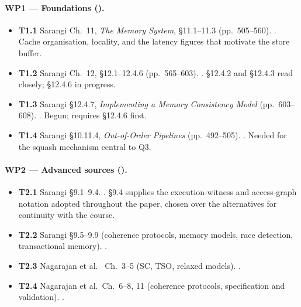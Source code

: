 \paragraph{WP1 --- Foundations ().}
\begin{itemize}[leftmargin=*,itemsep=1pt]
\item \textbf{T1.1} Sarangi \cite{sarangi2025basic} Ch.~11, \emph{The Memory
  System}, \S11.1--11.3 (pp.~505--560). . Cache organisation, locality,
  and the latency figures that motivate the store buffer.
\item \textbf{T1.2} Sarangi Ch.~12, \S12.1--12.4.6 (pp.~565--603). .
  \S12.4.2 and \S12.4.3 read closely; \S12.4.6 in progress.
\item \textbf{T1.3} Sarangi \S12.4.7, \emph{Implementing a Memory Consistency
  Model} (pp.~603--608). . Begun; requires \S12.4.6 first.
\item \textbf{T1.4} Sarangi \S10.11.4, \emph{Out-of-Order Pipelines}
  (pp.~492--505). . Needed for the squash mechanism central to Q3.
\end{itemize}

\paragraph{WP2 --- Advanced sources ().}
\begin{itemize}[leftmargin=*,itemsep=1pt]
\item \textbf{T2.1} Sarangi \cite{sarangi2023nextgen} \S9.1--9.4. .
  \S9.4 supplies the execution-witness and access-graph notation adopted
  throughout the paper, chosen over the alternatives for continuity with the
  course.
\item \textbf{T2.2} Sarangi \S9.5--9.9 (coherence protocols, memory models,
  race detection, transactional memory). .
\item \textbf{T2.3} Nagarajan et al.\ \cite{nagarajan2020primer} Ch.~3--5
  (SC, TSO, relaxed models). .
\item \textbf{T2.4} Nagarajan et al.\ Ch.~6--8, 11 (coherence protocols,
  specification and validation). .
\end{itemize}

